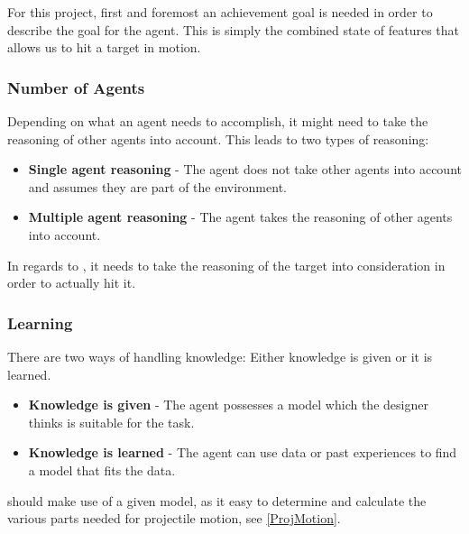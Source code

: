 For this project, first and foremost an achievement goal is needed in order to
describe the goal for the agent. This is simply the combined state of features
that allows us to hit a target in motion. 

\subsubsection{Number of Agents}
Depending on what an agent needs to accomplish, it might need to take the
reasoning of other agents into account. This leads to two types of reasoning:
\begin{itemize}
  \item \textbf{Single agent reasoning} - The agent does not take other
  agents into account and assumes they are part of the environment.
  \item \textbf{Multiple agent reasoning} - The agent takes the reasoning of
  other agents into account.
\end{itemize}

In regards to \namep, it needs to take the reasoning of the target into
consideration in order to actually hit it.


\subsubsection{Learning}

There are two ways of handling knowledge: Either knowledge is given or
it is learned. 
\begin{itemize}
  \item \textbf{Knowledge is given} - The agent possesses a model which the
designer thinks is suitable for the task.
  \item \textbf{Knowledge is learned} - The agent can use data or past
  experiences to find a model that fits the data.
\end{itemize}

\name should make use of a given model, as it easy to determine and
calculate the various parts needed for projectile motion, see
\autoref{ProjMotion}.


